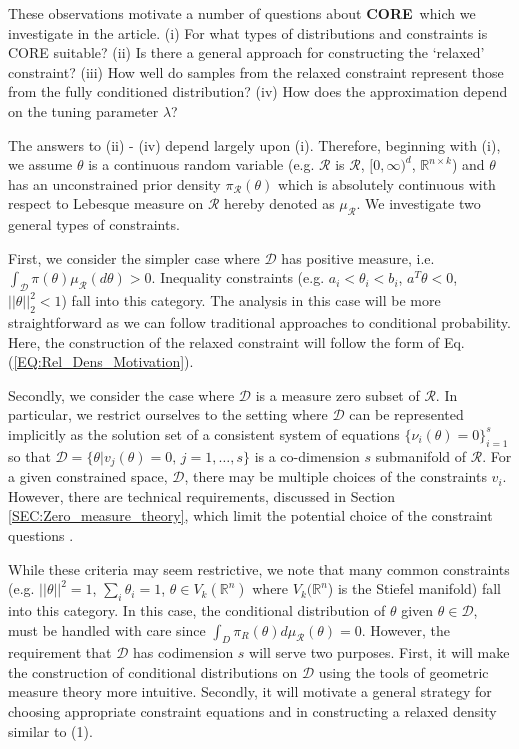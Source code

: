 \documentclass[10pt,fleqn]{article}
\newcommand{\leo}[1]{{\color{blue}{Leo: #1}}}
\newcommand{\core}{\textbf{CORE}}
\DeclareMathOperator{\1}{\mathbbm{1}}
\begin{document}
{These observations motivate a number of questions about \core\, which we investigate in the article.  (i) For what types of distributions and constraints is CORE suitable? (ii) Is there a general approach for constructing the `relaxed' constraint? (iii) How well do samples from the relaxed constraint represent those from the fully conditioned distribution? (iv) How does the approximation depend on the tuning parameter $\lambda$? 

The answers to (ii) - (iv) depend largely upon (i).  Therefore, beginning with (i), we assume $\theta$ is a continuous random variable (e.g. $\mathcal{R}$ is $\mathcal{R}$, $[0,\infty)^d$, $\mathbb{R}^{n\times k}$) and $\theta$ has an unconstrained prior density $\pi_\mathcal{R}(\theta)$ which is absolutely continuous with respect to Lebesque measure on $\mathcal{R}$ hereby denoted as $\mu_\mathcal{R}$.  We investigate two general types of constraints. 



First, we consider the simpler case where $\mathcal{D}$ has positive measure, i.e. $\int_\mathcal{D} \pi(\theta) \mu_\mathcal{R}(d\theta) >0.$ \leo{Generally,} Inequality constraints (e.g. $a_i < \theta_i < b_i$, $a^T\theta < 0$, $||\theta||_2^2 < 1$) fall into this category. The analysis in this case will be more straightforward as we can follow traditional approaches to conditional probability. Here, the construction of the relaxed constraint will follow the form of Eq. (\ref{EQ:Rel_Dens_Motivation}).

Secondly, we consider the case where $\mathcal{D}$ is a measure zero subset of $\mathcal{R}$. In particular, we restrict ourselves to the setting where $\mathcal{D}$ can be represented implicitly as the solution set of a consistent system of equations $\{\nu_i(\theta) = 0\}_{i=1}^s$ so that $\mathcal{D} =\{\theta | v_j(\theta) =0, \, j = 1, \dots,s\}$ is a co-dimension $s$ submanifold of $\mathcal{R}$.  For a given constrained space, $\mathcal{D}$, there may be multiple choices of the constraints $v_i$. However, there are technical requirements, discussed in Section \ref{SEC:Zero_measure_theory}, which limit the potential choice of the constraint questions \leo{perhaps avoid cross-referencing
later section, by simplifying this sentence
to `There are some limitations on the types of constraint one could use,
however we note that ...'}. 

While these criteria may seem restrictive, we note that many common constraints (e.g. $||\theta||^2 = 1$, $\sum_i \theta_i = 1$, $\theta \in V_k(\mathbb{R}^n)$ where $V_k(\mathbb{R}^n$) is the Stiefel manifold) fall into this category.  In this case, the conditional distribution of $\theta$ given $\theta \in \mathcal{D}$, must be handled with care since $\int_D \pi_R(\theta) d\mu_\mathcal{R} (\theta) =0$.  However, the requirement that $\mathcal{D}$ has codimension $s$ will serve two purposes.  First, it will make the construction of conditional distributions on $\mathcal{D}$ using the tools of geometric measure theory more intuitive.  Secondly, it will motivate a general strategy for choosing appropriate constraint equations and in constructing a relaxed density similar to (1). 

}
\end{document}
